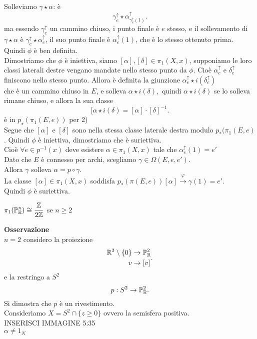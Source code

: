 \documentclass[12px]{article}
\begin{document}
\begin{dimo}
\begin{enumerate}
			Solleviamo  $\gamma\star \alpha$: è 
			 \[
				 \gamma^\uparrow_e\star \alpha^\uparrow_{\gamma^\uparrow_e(1)}
			.\] 
			ma essendo $\gamma^\uparrow_e$ un cammino chiuso, i punto finale è  $e$ stesso, e il sollevamento di $\gamma \star\alpha$ è  $\gamma_e^\uparrow\star\alpha^\uparrow_e$,  il suo punto finale è $\alpha^\uparrow_e(1)$, che è lo stesso ottenuto prima. Quindi  $\phi$ è ben definita.\\
			Dimostriamo che $\phi$ è iniettiva, siamo  $[\alpha], [\delta]\in\pi_1(X,x)$, supponiamo le loro classi laterali destre vengano mandate nello stesso punto da $\phi.$ Cioè  $\alpha^\uparrow_e$ e  $\delta^\uparrow_e$ finiscono nello stesso punto. Allora è definita la  giunzione $\alpha^\uparrow_e\star i(\delta^\uparrow_e)$\\
			che è un cammino chiuso in  $E$,  e solleva $\alpha\star i(\delta), $  quindi  $\alpha\star i(\delta)$ se lo solleva rimane chiuso, e allora la sua classe 
			 \[
				 [\alpha\star i(\delta) = [\alpha]\cdot[\delta]^{-1} 
			.\] 
			è in $p_\star(\pi_1(E,e))$ per 2)\\
			Segue che  $[\alpha]$ e  $[\delta]$ sono nella stessa classe laterale destra modulo  $p_*(\pi_1(E,e)$. Quindi $\phi$ è iniettiva, dimostriamo che è suriettiva.\\
			Cioè $\forall e\in p^{-1}(x)$ deve esistere $\alpha\in \pi_1(X,x)$ tale che  $\alpha^\uparrow_e(1) = e'$\\
			Dato che  $E$ è connesso per archi, scegliamo  $\gamma\in\Omega(E,e,e').$\\
			Allora $\gamma $ solleva  $\alpha = p\circ \gamma$.\\
			La classe  $[\alpha]\in\pi_1(X,x)$ soddisfa $p_*(\pi(E,e))[\alpha] \xrightarrow{\varphi} \gamma(1) = e'$.\\
			Quindi $\phi$ è suriettiva.
	\end{enumerate}
\end{dimo}
\begin{coro}
	$\displaystyle\pi_1(\mathbb{P}^n_{\mathbb{R}}) \cong \frac{\mathbb{Z}}{2\mathbb{Z}}$ se $n\geq 2$
\end{coro}
\textbf{Osservazione}\\
$n=2$ considero la proiezione 
\[
	\begin{aligned}
		
\R^3\setminus\{0\} &\rightarrow \pro^2_\R\\
	v &\rightarrow [v]
	\end{aligned}
.\]
e la restringo a $S^2$\\
 \[
p : S^2 \rightarrow\mathbb{P}^2_{\mathbb{R}}
.\] 
Si dimostra che $p$ è un rivestimento.\\
Consideriamo $X = S^2\cap \{z\geq 0\}$ ovvero la semisfera positiva.\\
INSERISCI IMMAGINE 5:35\\
$\alpha\neq 1_N$\\
\end{document}
